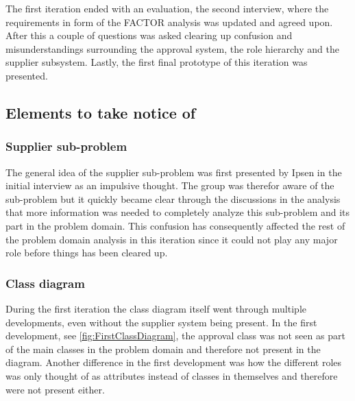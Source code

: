 The first iteration ended with an evaluation, the second interview, where the requirements in form of the FACTOR analysis was updated and agreed upon.
After this a couple of questions was asked clearing up confusion and misunderstandings surrounding the approval system, the role hierarchy and the supplier subsystem.
Lastly, the first final prototype of this iteration was presented.

\subsection{Elements to take notice of}
\subsubsection*{Supplier sub-problem}
The general idea of the supplier sub-problem was first presented by Ipsen in the initial interview as an impulsive thought. 
The group was therefor aware of the sub-problem but it quickly became clear through the discussions in the analysis that more information was needed to completely analyze this sub-problem and its part in the problem domain.
This confusion has consequently affected the rest of the problem domain analysis in this iteration since it could not play any major role  before things has been cleared up.

\subsubsection*{Class diagram}
During the first iteration the class diagram itself went through multiple developments, even without the supplier system being present.
In the first development, see \cref{fig:FirstClassDiagram}, the approval class was not seen as part of the main classes in the problem domain and therefore not present in the diagram.
Another difference in the first development was how the different roles was only thought of as attributes instead of classes in themselves and therefore were not present either.

